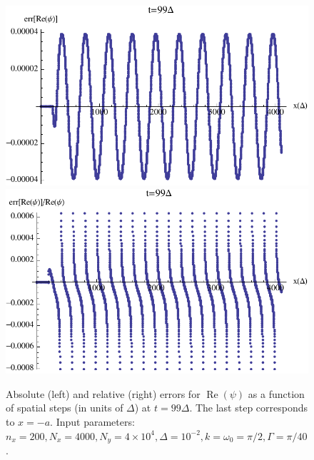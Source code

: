 \documentclass[12pt,letter,onecolumn,notitlepage]{article}
\DeclareMathOperator{\re}{Re}
\begin{document}
\begin{figure}[htbp]%
	\centering
		\includegraphics[scale=0.6]{abs_error_t_99}
		\includegraphics[scale=0.6]{rel_error_t_99}
	\caption{Absolute (left) and relative (right) errors for $\re(\psi)$ as a function of spatial steps (in units of $\Delta$) at $t=99\Delta$. The last step corresponds to $x=-a$. Input parameters: $n_x=200, N_x=4000, N_y=4\times10^4, \Delta=10^{-2}, k=\omega_0=\pi/2, \Gamma=\pi/40$.}
	\label{fig:error 99}
\end{figure}
\end{document}
